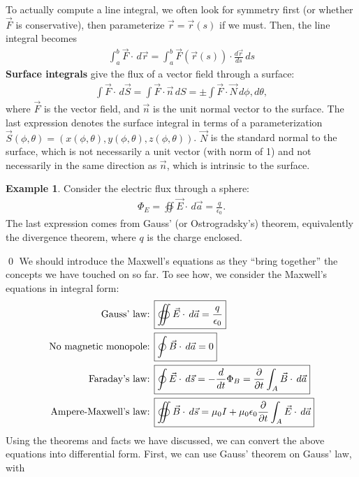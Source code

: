 \documentclass{book}
\theoremstyle{definition}
\newtheorem{exmp}{Example}[section]
\begin{document}
To actually compute a line integral, we often look for symmetry first (or whether $\vec{F}$ is conservative), then parameterize $\vec{r} = \vec{r}(s)$ if we must. Then, the line integral becomes
\begin{align*}
\int_{a}^{b}\vec{F}\cdot\,d\vec{r} = \int_{a}^{b}\vec{F}(\vec{r}(s))\cdot \frac{d\vec{r}}{ds}\,ds
\end{align*}
\textbf{Surface integrals} give the flux of a vector field through a surface:
\begin{align*}
\int \vec{F}\cdot\,d\vec{S} = \int\vec{F}\cdot\vec{n}\,dS = \pm\int\vec{F}\cdot\vec{N}\,d\phi,d\theta,
\end{align*}
where $\vec{F}$ is the vector field, and $\vec{n}$ is the unit normal vector to the surface. The last expression denotes the surface integral in terms of a parameterization $\vec{S}(\phi, \theta) = (x(\phi, \theta),y(\phi, \theta),z(\phi, \theta))$. $\vec{N}$ is the standard normal to the surface, which is not necessarily a unit vector (with norm of 1) and not necessarily in the same direction as $\vec{n}$, which is intrinsic to the surface.
\begin{exmp}
Consider the electric flux through a sphere:
\begin{align*}
\Phi_E = \oiint\vec{E}\cdot\,d\vec{a} = \frac{q}{\epsilon_0}.
\end{align*}
The last expression comes from Gauss' (or Ostrogradsky's) theorem, equivalently the divergence theorem, where $q$ is the charge enclosed.
\end{exmp}\qed
We should introduce the Maxwell's equations as they ``bring together'' the concepts we have touched on so far. To see how, we consider the Maxwell's equations in integral form:
\begin{align*}
\text{Gauss' law:  } \Aboxed{&\oiint\vec{E}\cdot\,d\vec{a} = \frac{q}{\epsilon_0}}\\
\text{No magnetic monopole:  } \Aboxed{&\oint\vec{B}\cdot\,d\vec{a} = 0}\\
\text{Faraday's law:  } 
\Aboxed{&\oint \vec{E}\cdot\,d\vec{s} = -\frac{d}{dt}\Phi_B = \frac{\partial}{\partial t}\int_A\vec{B}\cdot\,d\vec{a}}\\  
\text{Ampere-Maxwell's law:  } 
\Aboxed{&\oiint \vec{B}\cdot\,d\vec{s} = \mu_0I + \mu_0\epsilon_0\frac{\partial}{\partial t}\int_A\vec{E}\cdot\,d\vec{a}}
\end{align*}
Using the theorems and facts we have discussed, we can convert the above equations into differential form. First, we can use Gauss' theorem on Gauss' law, with
\end{document}
